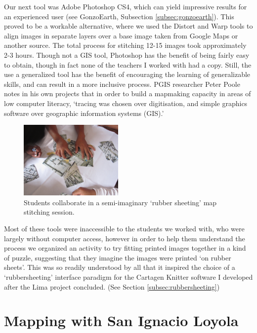 \documentclass[11pt,oneside,notitlepage]{report}
\begin{document}
{{Our next tool was Adobe Photoshop CS4, which can yield impressive results for an experienced user (see GonzoEarth, Subsection \ref{subsec:gonzoearth}). This proved to be a workable alternative, where we used the Distort and Warp tools to align images in separate layers over a base image taken from Google Maps or another source. The total process for stitching 12-15 images took approximately 2-3 hours. Though not a GIS tool, Photoshop has the benefit of being fairly easy to obtain, though in fact none of the teachers I worked with had a copy. Still, the use a generalized tool has the benefit of encouraging the learning of generalizable skills, and can result in a more inclusive process. \ac{PGIS} researcher Peter Poole notes in his own projects that in order to build a mapmaking capacity in areas of low computer literacy, `tracing was chosen over digitisation, and simple graphics software over geographic information systems (GIS).' \cite{poole2006there}

\begin{figure}
	\begin{flushright}
		\includegraphics[width=0.45\textwidth]{images/juan-pablo-rubbersheeting.jpg}
		\caption{Students collaborate in a semi-imaginary `rubber sheeting' map stitching session.}
	\end{flushright}
\end{figure}

Most of these tools were inaccessible to the students we worked with, who were largely without computer access, however in order to help them understand the process we organized an activity to try fitting printed images together in a kind of puzzle, suggesting that they imagine the images were printed `on rubber sheets'. This was so readily understood by all that it inspired the choice of a `rubbersheeting' interface paradigm for the Cartagen Knitter software I developed after the Lima project concluded. (See Section \ref{subsec:rubbersheeting})

\section{Mapping with San Ignacio Loyola}

}}
\end{document}

